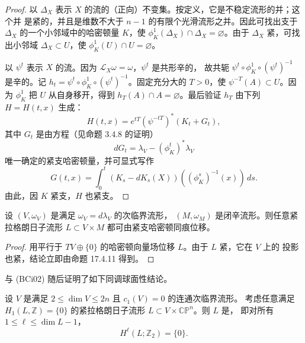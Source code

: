 \begin{proof}
以 $\Delta_X$ 表示 $X$ 的流的（正向）不变集。按定义，它是不稳定流形的并；这个并
是紧的，并且是维数不大于 $n-1$ 的有限个光滑流形之并。因此可找出支于
$\Delta_X$ 的一个小邻域中的哈密顿量 $K$，使
$\phi_K^1(\Delta_X)\cap\Delta_X=\varnothing$。由于 $\Delta_X$ 紧，可找出小邻域
$\Delta_X\subset U$，使 $\phi_K^1(U)\cap U=\varnothing$。

以 $\psi^t$ 表示 $X$ 的流。因为 $\mathcal L_X\omega=\omega$，$\psi^t$ 是共形辛的，
故共轭 $\psi^t\circ\phi_K^1\circ(\psi^t)^{-1}$ 是辛的。记
$h_t=\psi^t\circ\phi_K^1\circ(\psi^t)^{-1}$。固定充分大的 $T>0$，使
$\psi^{-T}(A)\subset U$。因为 $\phi_K^1$ 把 $U$ 从自身移开，得到
$h_T(A)\cap A=\varnothing$。最后验证 $h_T$ 由下列 $H=H(t,x)$ 生成：
\[
 H(t,x)=e^{tT}(\psi^{-tT})^*(K_t+G_t),
\]
其中 $G_t$ 是由方程（见命题 3.4.8 的证明）
\[
 dG_t=\lambda_V-(\phi_K^t)^*\lambda_V
\]
唯一确定的紧支哈密顿量，并可显式写作
\[
 G(t,x)=\int_0^t(K_s-dK_s(X))((\phi_K^s)^{-1}(x))\,ds.
\]
由此，因 $K$ 紧支，$H$ 也紧支。
\end{proof}

\begin{lemma}
\label{lem:product-lagrangian-displaceable}
设 $(V,\omega_V)$ 是满足 $\omega_V=d\lambda_V$ 的次临界\personWeinstein{}流形，
$(M,\omega_M)$ 是闭辛流形。则任意紧拉格朗日子流形
$L\subset V\times M$ 都可由紧支哈密顿同痕位移。
\end{lemma}

\begin{proof}
用平行于 $TV\oplus\{0\}$ 的哈密顿向量场位移 $L$。由于 $L$ 紧，它在 $V$ 上的
投影也紧，结论立即由命题 17.4.11 得到。
\end{proof}

\personBiran{}与\personCieliebak{} (BCi02) 随后证明了如下同调球面性结论。

\begin{theorem}[\personBiran{}--\personCieliebak{}]
\label{thm:biran-cieliebak-spherical}
设 $V$ 是满足 $2\leq\dim V\leq2n$ 且 $c_1(V)=0$ 的连通次临界\personWeinstein{}流形。
考虑任意满足 $H_1(L,\mathbb Z)=\{0\}$ 的紧拉格朗日子流形
$L\subset V\times\mathbb{CP}^n$。则 $L$ 是\termCohomologicallySpherical{}，
即对所有 $1\leq\ell\leq\dim L-1$，
\[
 H^\ell(L;\mathbb Z_2)=\{0\}.
\]
\end{theorem}

